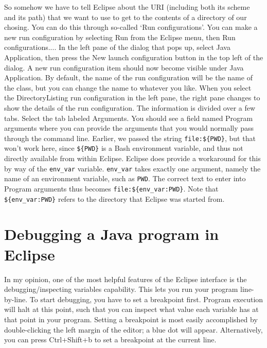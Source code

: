 So somehow we have to tell Eclipse about the URI (including both its scheme and its path) that we want to use to get to the contents of a directory of our chosing. You can do this through so-called `Run configurations'. You can make a new run configuration by selecting \textsf{Run} from the Eclipse menu, then \textsf{Run configurations...}. In the left pane of the dialog that pops up, select \textsf{Java Application}, then press the \textsf{New launch configuration} button in the top left of the dialog. A new run configuration item should now become visible under \textsf{Java Application}. By default, the name of the run configuration will be the name of the class, but you can change the name to whatever you like. When you select the \textsf{DirectoryListing} run configuration in the left pane, the right pane changes to show the details of the run configuration. The information is divided over a few tabs. Select the tab labeled \textsf{Arguments}. You should see a field named \textsf{Program arguments} where you can provide the arguments that you would normally pass through the command line. Earlier, we passed the string \texttt{file:\$\{PWD\}}, but that won't work here, since \texttt{\$\{PWD\}} is a Bash environment variable, and thus not directly available from within Eclipse. Eclipse does provide a workaround for this by way of the \texttt{env\_var} variable. \texttt{env\_var} takes exactly one argument, namely the name of an environment variable, such as \texttt{PWD}. The correct text to enter into \textsf{Program arguments} thus becomes \texttt{file:\$\{env\_var:PWD\}}. Note that \texttt{\$\{env\_var:PWD\}} refers to the directory that Eclipse was started from.





\section{Debugging a Java program in Eclipse}




In my opinion, one of the most helpful features of the Eclipse interface is the debugging/inspecting variables capability. This lets you run your program line-by-line. To start debugging, you have to set a breakpoint first. Program execution will halt at this point, such that you can inspect what value each variable has at that point in your program. Setting a breakpoint is most easily accomplished by double-clicking the left margin of the editor; a blue dot will appear. Alternatively, you can press \textsf{Ctrl+Shift+b} to set a breakpoint at the current line.

